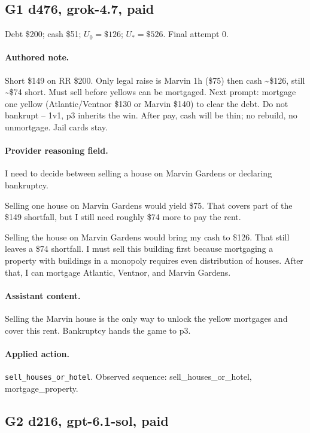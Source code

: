 \subsection*{G1 d476, grok-4.7, paid}

\noindent Debt \$200; cash \$51; $U_0=\$126$; $U_*=\$526$. Final attempt 0.\par

\paragraph{Authored note.} Short \$149 on RR \$200. Only legal raise is Marvin 1h (\$75)  then  cash \textasciitilde{}\$126, still \textasciitilde{}\$74 short. Must sell before yellows can be mortgaged. Next prompt: mortgage one yellow (Atlantic/Ventnor \$130 or Marvin \$140) to clear the debt. Do not bankrupt  --  1v1, p3 inherits the win. After pay, cash will be thin; no rebuild, no unmortgage. Jail cards stay.

\paragraph{Provider reasoning field.} I need to decide between selling a house on Marvin Gardens or declaring bankruptcy.

Selling one house on Marvin Gardens would yield \$75. That covers part of the \$149 shortfall, but I still need roughly \$74 more to pay the rent.

Selling the house on Marvin Gardens would bring my cash to \$126. That still leaves a \$74 shortfall. I must sell this building first because mortgaging a property with buildings in a monopoly requires even distribution of houses. After that, I can mortgage Atlantic, Ventnor, and Marvin Gardens.

\paragraph{Assistant content.} Selling the Marvin house is the only way to unlock the yellow mortgages and cover this rent. Bankruptcy hands the game to p3.

\paragraph{Applied action.} \texttt{sell\_houses\_or\_hotel}. Observed sequence: sell\_houses\_or\_hotel, mortgage\_property.

\subsection*{G2 d216, gpt-6.1-sol, paid}


